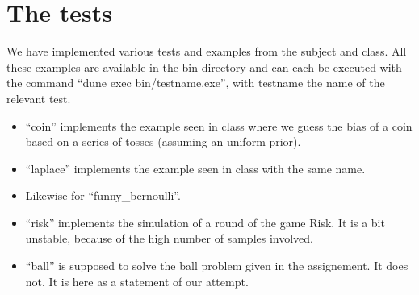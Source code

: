 \documentclass{article}
\begin{document}
\section{The tests}

We have implemented various tests and examples from the subject and class.
All these examples are available in the bin directory and can each be executed with the command ``dune exec bin/testname.exe'', with testname the name of the relevant test. \\

\begin{itemize}
	\item ``coin'' implements the example seen in class where we guess the bias of a coin based on a series of tosses (assuming an uniform prior).
	\item ``laplace'' implements the example seen in class with the same name.
	\item Likewise for ``funny\_bernoulli''.
	\item ``risk'' implements the simulation of a round of the game Risk.
	      It is a bit unstable, because of the high number of samples involved.
	\item ``ball'' is supposed to solve the ball problem given in the assignement.
	      It does not. It is here as a statement of our attempt.
\end{itemize}
\end{document}
